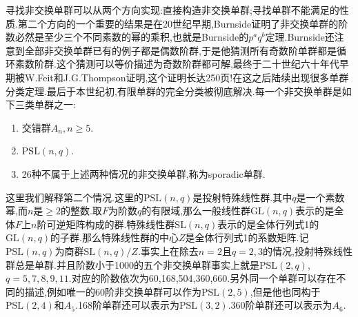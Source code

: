 寻找非交换单群可以从两个方向实现:直接构造非交换单群;寻找单群不能满足的性质.第二个方向的一个重要的结果是在20世纪早期,Burnside证明了非交换单群的阶数必然是至少三个不同素数的幂的乘积,也就是Burnside的$p^aq^b$定理.Burnside还注意到全部非交换单群已有的例子都是偶数阶群,于是他猜测所有奇数阶单群都是循环素数阶群.这个猜测可以等价描述为奇数阶群都可解,最终于二十世纪六十年代早期被W.Feit和J.G.Thompson证明,这个证明长达250页!在这之后陆续出现很多单群分类定理.最后于本世纪初,有限单群的完全分类被彻底解决.每一个非交换单群是如下三类单群之一:
\begin{enumerate}
	\item 交错群$A_n,n\ge5$.
	\item $\mathrm{PSL}(n,q)$.
	\item 26种不属于上述两种情况的非交换单群,称为sporadic单群.
\end{enumerate}

这里我们解释第二个情况.这里的$\mathrm{PSL}(n,q)$是投射特殊线性群.其中$q$是一个素数幂,而$n$是$\ge2$的整数.取$F$为阶数$q$的有限域,那么一般线性群$\mathrm{GL}(n,q)$表示的是全体$F$上$n$阶可逆矩阵构成的群.特殊线性群$\mathrm{SL}(n,q)$表示的是全体行列式1的$\mathrm{GL}(n,q)$的子群.那么特殊线性群的中心$Z$是全体行列式1的系数矩阵.记$\mathrm{PSL}(n,q)$为商群$\mathrm{SL}(n,q)/Z$.事实上在除去$n=2$且$q=2,3$的情况,投射特殊线性群总是单群.并且阶数小于1000的五个非交换单群事实上就是$\mathrm{PSL}(2,q)$, $q=5,7,8,9,11$.对应的阶数依次为60,168,504,360,660.另外同一个单群可以存在不同的描述,例如唯一的60阶非交换单群可以作为$\mathrm{PSL}(2,5)$,但是他也同构于$\mathrm{PSL}(2,4)$和$A_5$.168阶单群还可以表示为$\mathrm{PSL}(3,2)$.360阶单群还可以表示为$A_6$.


